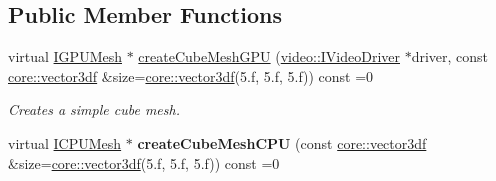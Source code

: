 \subsection*{Public Member Functions}
\begin{DoxyCompactItemize}
\item 
virtual \hyperlink{classirr_1_1scene_1_1IMesh}{I\+G\+P\+U\+Mesh} $\ast$ \hyperlink{classirr_1_1scene_1_1IGeometryCreator_a1676dd58d6bfd7546e728dd9ea5599f6}{create\+Cube\+Mesh\+G\+PU} (\hyperlink{classirr_1_1video_1_1IVideoDriver}{video\+::\+I\+Video\+Driver} $\ast$driver, const \hyperlink{namespaceirr_1_1core_a06f169d08b5c429f5575acb7edbad811}{core\+::vector3df} \&size=\hyperlink{namespaceirr_1_1core_a06f169d08b5c429f5575acb7edbad811}{core\+::vector3df}(5.f, 5.f, 5.f)) const  =0
\begin{DoxyCompactList}\small\item\em Creates a simple cube mesh. \end{DoxyCompactList}\item 
virtual \hyperlink{classirr_1_1scene_1_1IMesh}{I\+C\+P\+U\+Mesh} $\ast$ {\bfseries create\+Cube\+Mesh\+C\+PU} (const \hyperlink{namespaceirr_1_1core_a06f169d08b5c429f5575acb7edbad811}{core\+::vector3df} \&size=\hyperlink{namespaceirr_1_1core_a06f169d08b5c429f5575acb7edbad811}{core\+::vector3df}(5.f, 5.f, 5.f)) const  =0\hypertarget{classirr_1_1scene_1_1IGeometryCreator_aba9a44905c6b09242da0b2646feed423}{}\label{classirr_1_1scene_1_1IGeometryCreator_aba9a44905c6b09242da0b2646feed423}


\end{DoxyCompactItemize}
